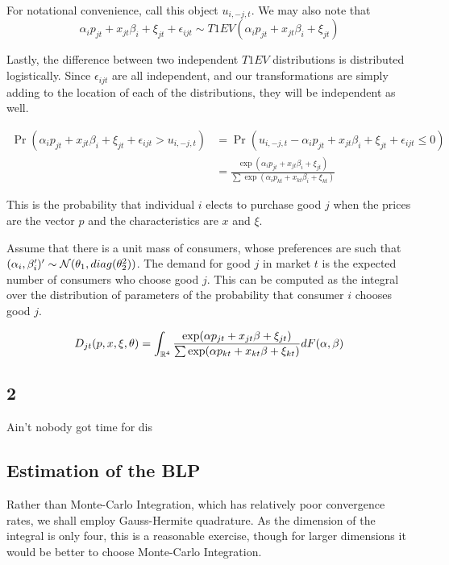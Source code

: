 \documentclass[12pt]{paper}
\begin{document}
For notational convenience, call this object $u_{i,-j,t}$. We may also
note that
\begin{equation*}
  \alpha_i p_{jt} + x_{jt} \beta_i + \xi_{jt} + \epsilon_{ijt} \sim T1EV( \alpha_i p_{jt} + x_{jt} \beta_i + \xi_{jt} )
\end{equation*}

Lastly, the difference between two independent $T1EV$ distributions is
distributed logistically. Since $\epsilon_{ijt}$ are all independent, and our
transformations are simply adding to the location of each of the
distributions, they will be independent as well.

\begin{align*}
  \Pr( \alpha_i p_{jt} + x_{jt} \beta_i + \xi_{jt} + \epsilon_{ijt} > u_{i,-j,t} )
  &= \Pr( u_{i,-j,t} -\alpha_i p_{jt} +x_{jt}\beta_i +\xi_{jt} +\epsilon_{ijt} \leq 0)\\
  &= \frac{\exp(\alpha_i p_{jt} + x_{jt} \beta_i + \xi_{jt})}{\sum \exp(\alpha_i p_{kt} +
    x_{kt}\beta_i + \xi_{kt})}
\end{align*}

This is the probability that individual $i$ elects to purchase good $j$
when the prices are the vector $p$ and the characteristics are $x$ and
$\xi$.

Assume that there is a unit mass of consumers, whose preferences are
such that
$(\alpha_i, \beta_i')' \sim \mathcal{N}( \theta_1, diag(\theta_2^2))$. The demand for good
$j$ in market $t$ is the expected number of consumers who choose good
$j$. This can be computed as the integral over the distribution of
parameters of the probability that consumer $i$ chooses good $j$.

\begin{equation*}
  D_{jt}(p,x,\xi,\theta) = \int_{\mathbb{R}^4} \frac{\exp(\alpha p_{jt} + x_{jt} \beta +
    \xi_{jt})}{\sum \exp(\alpha p_{kt} + x_{kt}\beta + \xi_{kt})} dF(\alpha,\beta)
\end{equation*}

\subsection{2}

Ain't nobody got time for dis

\subsection{Estimation of the BLP}

Rather than Monte-Carlo Integration, which has relatively poor
convergence rates, we shall employ Gauss-Hermite quadrature. As the
dimension of the integral is only four, this is a reasonable exercise,
though for larger dimensions it would be better to choose Monte-Carlo
Integration.
\end{document}
